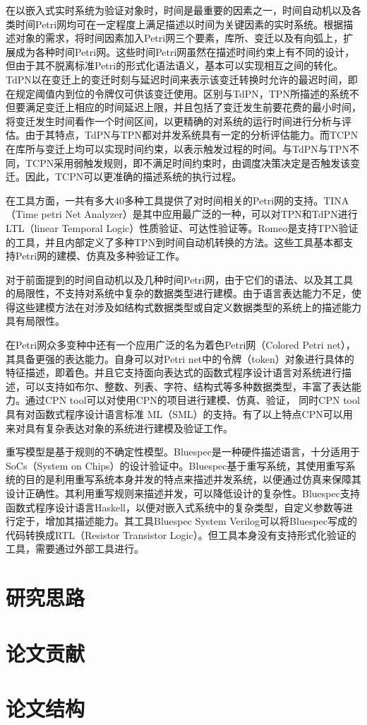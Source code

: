 在以嵌入式实时系统为验证对象时，时间是最重要的因素之一，时间自动机以及各类时间Petri网均可在一定程度上满足描述以时间为关键因素的实时系统。根据描述对象的需求，将时间因素加入Petri网三个要素，库所、变迁以及有向弧上，扩展成为各种时间Petri网。这些时间Petri网虽然在描述时间约束上有不同的设计，但由于其不脱离标准Petri的形式化语法语义，基本可以实现相互之间的转化。TdPN以在变迁上的变迁时刻与延迟时间来表示该变迁转换时允许的最迟时间，即在规定阈值内到位的令牌仅可供该变迁使用。区别与TdPN，TPN所描述的系统不但要满足变迁上相应的时间延迟上限，并且包括了变迁发生前要花费的最小时间，将变迁发生时间看作一个时间区间，以更精确的对系统的运行时间进行分析与评估。由于其特点，TdPN与TPN都对并发系统具有一定的分析评估能力。而TCPN在库所与变迁上均可以实现时间约束，以表示触发过程的时间。与TdPN与TPN不同，TCPN采用弱触发规则，即不满足时间约束时，由调度决策决定是否触发该变迁。因此，TCPN可以更准确的描述系统的执行过程。

在工具方面，一共有多大40多种工具提供了对时间相关的Petri网的支持。TINA（Time petri Net Analyzer）是其中应用最广泛的一种，可以对TPN和TdPN进行LTL（linear Temporal Logic）性质验证、可达性验证等。Romeo是支持TPN验证的工具，并且内部定义了多种TPN到时间自动机转换的方法。这些工具基本都支持Petri网的建模、仿真及多种验证工作。

对于前面提到的时间自动机以及几种时间Petri网，由于它们的语法、以及其工具的局限性，不支持对系统中复杂的数据类型进行建模。由于语言表达能力不足，使得这些建模方法在对涉及如结构式数据类型或自定义数据类型的系统上的描述能力具有局限性。

在Petri网众多变种中还有一个应用广泛的名为着色Petri网（Colored Petri net），其具备更强的表达能力。自身可以对Petri net中的令牌（token）对象进行具体的特征描述，即着色。并且它支持面向表达式的函数式程序设计语言对系统进行描述，可以支持如布尔、整数、列表、字符、结构式等多种数据类型，丰富了表达能力。通过CPN tool可以对使用CPN的项目进行建模、仿真、验证， 同时CPN tool具有对函数式程序设计语言标准 ML（SML）的支持。有了以上特点CPN可以用来对具有复杂表达对象的系统进行建模及验证工作。

重写模型是基于规则的不确定性模型。Bluespec是一种硬件描述语言，十分适用于SoCs（System on Chips）的设计验证中。Bluespec基于重写系统，其使用重写系统的目的是利用重写系统本身并发的特点来描述并发系统，以便通过仿真来保障其设计正确性。其利用重写规则来描述并发，可以降低设计的复杂性。Bluespec支持函数式程序设计语言Haskell，以便对嵌入式系统中的复杂类型，自定义参数等进行定于，增加其描述能力。其工具Bluespec System Verilog可以将Bluespec写成的代码转换成RTL（Resistor Transistor Logic）。但工具本身没有支持形式化验证的工具，需要通过外部工具进行。



\section{研究思路}


\section{论文贡献}
\label{sec:theorem}

\section{论文结构}
\label{sec:bib}
